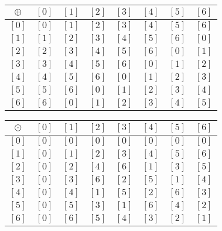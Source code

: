 \begin{list}{}
\item \begin{list}{\bf{(b)}}
\item \begin{tabular}{ c | c  c  c  c  c  c  c}
$\oplus$ & $[ 0 ]$ & $[ 1 ]$ & $[ 2 ]$ & $[ 3 ]$ & 
$[ 4 ]$ & $[ 5 ]$ & $[ 6 ]$  \\ \hline

$[ 0 ]$ & $[ 0 ]$ & $[ 1 ]$ & $[ 2 ]$ & 
$[ 3 ]$ & $[ 4 ]$ & $[ 5 ]$ & $[ 6 ]$  \\ 

$[ 1 ]$ & $[ 1 ]$ & $[ 2 ]$ & $[ 3 ]$ & 
$[ 4 ]$ & $[ 5 ]$ & $[ 6 ]$ & $[ 0 ]$  \\ 

$[ 2 ]$ & $[ 2 ]$ & $[ 3 ]$ & $[ 4 ]$ & 
$[ 5 ]$ & $[ 6 ]$ & $[ 0 ]$ & $[ 1 ]$  \\ 

$[ 3 ]$ & $[ 3 ]$ & $[ 4 ]$ & $[ 5 ]$ & 
$[ 6 ]$ & $[ 0 ]$ & $[ 1 ]$ & $[ 2 ]$ \\ 

$[ 4 ]$ & $[ 4 ]$ & $[ 5 ]$ & $[ 6 ]$ & 
$[ 0 ]$ & $[ 1 ]$ & $[ 2 ]$ & $[ 3 ]$  \\ 

$[ 5 ]$ & $[ 5 ]$ & $[ 6 ]$ & $[ 0 ]$ & 
$[ 1 ]$ & $[ 2 ]$ & $[ 3 ]$ & $[ 4 ]$  \\ 

$[ 6 ]$ & $[ 6 ]$ & $[ 0 ]$ & $[ 1 ]$ & 
$[ 2 ]$ & $[ 3 ]$ & $[ 4 ]$ & $[ 5 ]$  \\ 
\end{tabular}

\vskip9pt

\begin{tabular}{ c | c  c  c  c  c  c  c}
$\odot$ & $[ 0 ]$ & $[ 1 ]$ & $[ 2 ]$ & $[ 3 ]$ & 
$[ 4 ]$ & $[ 5 ]$ & $[ 6 ]$  \\ \hline

$[ 0 ]$ & $[ 0 ]$ & $[ 0 ]$ & $[ 0 ]$ & 
$[ 0 ]$ & $[ 0 ]$ & $[ 0 ]$ & $[ 0 ]$  \\ 

$[ 1 ]$ & $[ 0 ]$ & $[ 1 ]$ & $[ 2 ]$ & 
$[ 3 ]$ & $[ 4]$ & $[ 5 ]$ & $[ 6 ]$  \\ 

$[ 2 ]$ & $[ 0 ]$ & $[ 2 ]$ & $[ 4 ]$ & 
$[ 6 ]$ & $[ 1 ]$ & $[ 3 ]$ & $[ 5 ]$  \\ 

$[ 3 ]$ & $[ 0 ]$ & $[ 3 ]$ & $[ 6 ]$ & 
$[ 2 ]$ & $[ 5 ]$ & $[ 1 ]$ & $[ 4 ]$  \\ 

$[ 4 ]$ & $[ 0 ]$ & $[ 4 ]$ & $[ 1 ]$ & 
$[ 5 ]$ & $[ 2 ]$ & $[ 6 ]$ & $[ 3 ]$  \\ 

$[ 5 ]$ & $[ 0 ]$ & $[ 5 ]$ & $[ 3 ]$ & 
$[ 1 ]$ & $[ 6 ]$ & $[ 4 ]$ & $[ 2 ]$  \\ 

$[ 6 ]$ & $[ 0 ]$ & $[ 6 ]$ & $[ 5 ]$ & 
$[ 4 ]$ & $[ 3 ]$ & $[ 2 ]$ & $[ 1 ]$  \\ 
\end{tabular}
\end{list}
\end{list}

